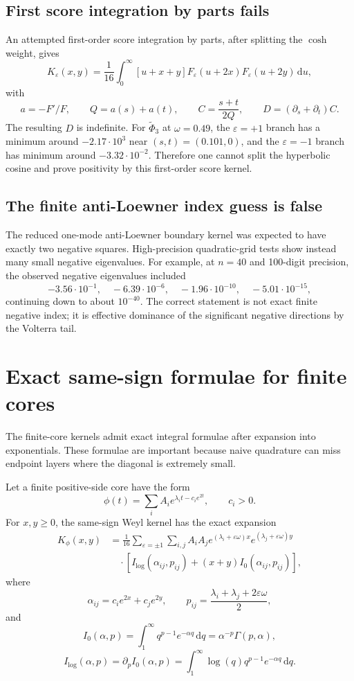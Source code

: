 \documentclass[11pt]{article}
\newcommand{\eps}{\varepsilon}
\newcommand{\dd}{\,\mathrm d}
\begin{document}
\subsection{First score integration by parts fails}

An attempted first-order score integration by parts, after splitting the
$\cosh$ weight, gives
\[
  K_\eps(x,y)
  =
  \frac1{16}\int_0^\infty
  [u+x+y]F_\eps(u+2x)F_\eps(u+2y)\dd u,
\]
with
\[
  a=-F'/F,\qquad Q=a(s)+a(t),\qquad
  C=\frac{s+t}{2Q},\qquad D=(\partial_s+\partial_t)C.
\]
The resulting $D$ is indefinite.  For $\widetilde\Phi_3$ at $\omega=0.49$,
the $\eps=+1$ branch has a minimum around $-2.17\cdot 10^3$ near
$(s,t)=(0.101,0)$, and the $\eps=-1$ branch has minimum around
$-3.32\cdot 10^{-2}$.  Therefore one cannot split the hyperbolic cosine and
prove positivity by this first-order score kernel.

\subsection{The finite anti-Loewner index guess is false}

The reduced one-mode anti-Loewner boundary kernel was expected to have exactly
two negative squares.  High-precision quadratic-grid tests show instead many
small negative eigenvalues.  For example, at $n=40$ and 100-digit precision,
the observed negative eigenvalues included
\[
 -3.56\cdot 10^{-1},\quad
 -6.39\cdot 10^{-6},\quad
 -1.96\cdot 10^{-10},\quad
 -5.01\cdot 10^{-15},
\]
continuing down to about $10^{-40}$.  The correct statement is not exact
finite negative index; it is effective dominance of the significant negative
directions by the Volterra tail.

\section{Exact same-sign formulae for finite cores}

The finite-core kernels admit exact integral formulae after expansion into
exponentials.  These formulae are important because naive quadrature can miss
endpoint layers where the diagonal is extremely small.

Let a finite positive-side core have the form
\[
   \phi(t)=\sum_i A_i e^{\lambda_i t-c_ie^{2t}},
   \qquad c_i>0.
\]
For $x,y\ge 0$, the same-sign Weyl kernel has the exact expansion
\begin{equation}
\begin{aligned}
 K_\phi(x,y)
 &=
 \frac1{16}\sum_{\eps=\pm1}\sum_{i,j}
 A_iA_j e^{(\lambda_i+\eps\omega)x}e^{(\lambda_j+\eps\omega)y}
 \\
 &\quad\cdot
 \left[
    I_{\log}(\alpha_{ij},p_{ij})
    +(x+y)I_0(\alpha_{ij},p_{ij})
 \right],
\end{aligned}
\label{eq:samesign}
\end{equation}
where
\[
   \alpha_{ij}=c_ie^{2x}+c_je^{2y},
   \qquad
   p_{ij}=\frac{\lambda_i+\lambda_j+2\eps\omega}{2},
\]
and
\[
   I_0(\alpha,p)=\int_1^\infty q^{p-1}e^{-\alpha q}\dd q
     =\alpha^{-p}\Gamma(p,\alpha),
\]
\[
   I_{\log}(\alpha,p)=\partial_p I_0(\alpha,p)
     =\int_1^\infty \log(q)q^{p-1}e^{-\alpha q}\dd q.
\]
\end{document}
